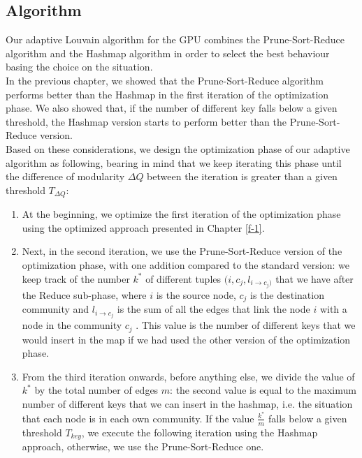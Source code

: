 \subsection{Algorithm}
Our adaptive Louvain algorithm for the GPU combines the Prune-Sort-Reduce algorithm and the Hashmap algorithm in order to select the best behaviour basing the choice on the situation. \\ In the previous chapter, we showed that the Prune-Sort-Reduce algorithm performs better than the Hashmap in the first iteration of the optimization phase. We also showed that, if the number of different key falls below a given threshold, the Hashmap version starts to perform better than the Prune-Sort-Reduce version.\\
Based on these considerations, we design the optimization phase of our adaptive algorithm as following, bearing in mind that we keep iterating this phase until the difference of modularity $\Delta Q$ between the iteration is greater than a given threshold  $T_{\Delta Q}$:
\begin{enumerate}
	\item At the beginning, we optimize the first iteration of the optimization phase using the optimized approach presented in Chapter \ref{f-1}.
	\item Next, in the second iteration, we use the Prune-Sort-Reduce version of the optimization phase, with one addition compared to the standard version: we keep track of the number $k^*$ of different tuples $(i,c_j,l_{i\rightarrow c_j)}$ that we have after the Reduce sub-phase,  where $i$ is the source node, $c_j$ is the destination community and $l_{i\rightarrow c_j}$ is the sum of all the edges that link the node $i$ with a node in the community $c_j$ . This value is the number of different keys that we would insert in the map if we had used the other version of the optimization phase.
	\item From the third iteration onwards, before anything else, we divide the value of $k^*$ by the total number of edges $m$: the second value is equal to the maximum number of different keys that we can insert in the hashmap, i.e. the situation that each node is in each own community. If the value $\frac{k^*}{m}$ falls below a given threshold $T_{key}$, we execute the following iteration using the Hashmap approach, otherwise, we use the Prune-Sort-Reduce one. 
\end{enumerate}
